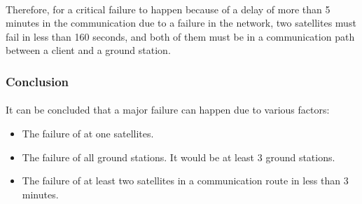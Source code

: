 \documentclass[12pt,a4paper]{report}
\begin{document}
\paragraph{}Therefore, for a critical failure to happen because of a delay of more than 5 minutes in the communication due to a failure in the network, two satellites must fail in less than 160 seconds, and both of them must be in a communication path between a client and a ground station.

\subsubsection{Conclusion}

\paragraph{}It can be concluded that a major failure can happen due to various factors:
\begin{itemize}
\item The failure of at one satellites.
\item The failure of all ground stations. It would be at least 3 ground stations.
\item The failure of at least two satellites in a communication route in less than 3 minutes.
\end{itemize}
\end{document}
